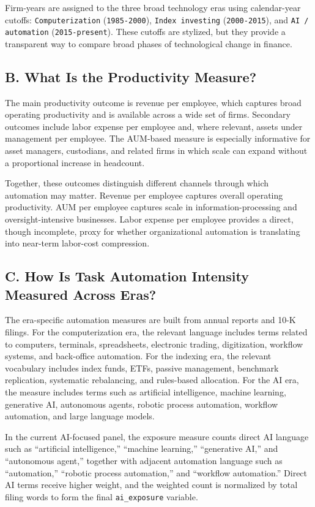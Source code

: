 \documentclass[11pt]{article}
\begin{document}
Firm-years are assigned to the three broad technology eras using calendar-year cutoffs: \texttt{Computerization} (\texttt{1985-2000}), \texttt{Index investing} (\texttt{2000-2015}), and \texttt{AI / automation} (\texttt{2015-present}). These cutoffs are stylized, but they provide a transparent way to compare broad phases of technological change in finance.

\subsection{B. What Is the Productivity Measure?}
The main productivity outcome is revenue per employee, which captures broad operating productivity and is available across a wide set of firms. Secondary outcomes include labor expense per employee and, where relevant, assets under management per employee. The AUM-based measure is especially informative for asset managers, custodians, and related firms in which scale can expand without a proportional increase in headcount.

Together, these outcomes distinguish different channels through which automation may matter. Revenue per employee captures overall operating productivity. AUM per employee captures scale in information-processing and oversight-intensive businesses. Labor expense per employee provides a direct, though incomplete, proxy for whether organizational automation is translating into near-term labor-cost compression.

\subsection{C. How Is Task Automation Intensity Measured Across Eras?}
The era-specific automation measures are built from annual reports and 10-K filings. For the computerization era, the relevant language includes terms related to computers, terminals, spreadsheets, electronic trading, digitization, workflow systems, and back-office automation. For the indexing era, the relevant vocabulary includes index funds, ETFs, passive management, benchmark replication, systematic rebalancing, and rules-based allocation. For the AI era, the measure includes terms such as artificial intelligence, machine learning, generative AI, autonomous agents, robotic process automation, workflow automation, and large language models.

In the current AI-focused panel, the exposure measure counts direct AI language such as ``artificial intelligence,'' ``machine learning,'' ``generative AI,'' and ``autonomous agent,'' together with adjacent automation language such as ``automation,'' ``robotic process automation,'' and ``workflow automation.'' Direct AI terms receive higher weight, and the weighted count is normalized by total filing words to form the final \texttt{ai\_exposure} variable.
\end{document}
